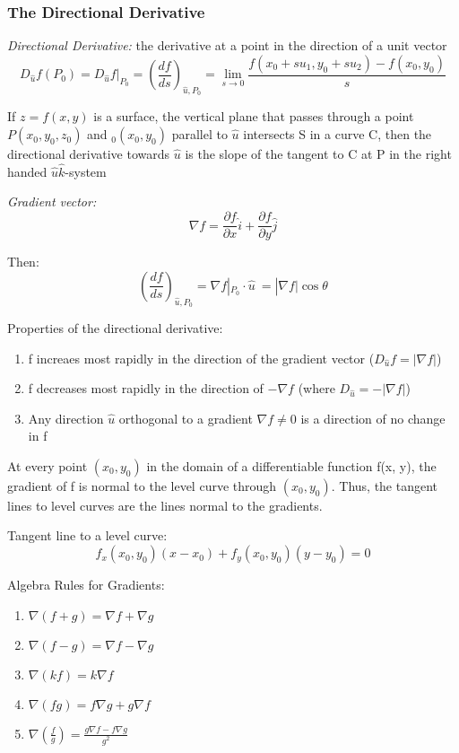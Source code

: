 \documentclass[12pt]{article}
\begin{document}
\subsubsection{The Directional Derivative}
\emph{Directional Derivative:}
the derivative at a point in the direction of a unit vector 
\[ D_{\hat{u}} f(P_0) = D_{\hat{u}} f |_{P_0} = \left(\frac{df}{ds}
\right)_{\hat{u}, P_0} = \lim_{s \to 0} \frac{f(x_0 + su_1, y_0 +su_2)-f(x_0, y_0)}{s} \]

If $z = f(x, y)$ is a surface, the vertical plane that passes through a point $P(x_0, y_0, z_0)$ and $_0 (x_0, y_0)$ parallel to $\hat{u}$ intersects S in a curve C, then the directional derivative towards $\hat{u}$ is the slope of the tangent to C at P in the right handed $\hat{u}\hat{k}$-system

\emph{Gradient vector:} 
\[\nabla f = \frac{\partial f}{\partial x} \hat{i} + \frac{\partial f}{\partial y} \hat{j}\]

Then:
\[\left(\frac{df}{ds}\right)_{\hat{u}, P_0} = \nabla f |_{P_0} \cdot \hat{u}\ = |\nabla f| \cos \theta \]

Properties of the directional derivative:
\begin{enumerate}
    \item f increaes most rapidly in the direction of the gradient vector ($D_{\hat{u}} f = |\nabla f|$)
    \item f decreases most rapidly in the direction of $-\nabla f$ (where $D_{\hat{u}} = -|\nabla f|$)
    \item Any direction $\hat{u}$ orthogonal to a gradient $\nabla f \neq 0$ is a direction of no change in f 
\end{enumerate}

At every point $(x_0, y_0)$ in the domain of a differentiable function f(x, y), the gradient of f is normal to the level curve through $(x_0, y_0)$. Thus, the tangent lines to level curves are the lines normal to the gradients.

Tangent line to a level curve:
\[f_x(x_0, y_0) (x- x_0) + f_y (x_0, y_0)(y-y_0) = 0\]

Algebra Rules for Gradients:
\begin{enumerate}
    \item $\nabla(f +g) = \nabla f + \nabla g$
    \item $\nabla(f - g) = \nabla f - \nabla g$
    \item $\nabla (kf) = k\nabla f$
    \item $\nabla (fg) = f\nabla g + g \nabla f$
    \item $\nabla \left(\frac{f}{g}\right) = \frac{g\nabla f - f\nabla g}{g^2}$
\end{enumerate}
\end{document}
